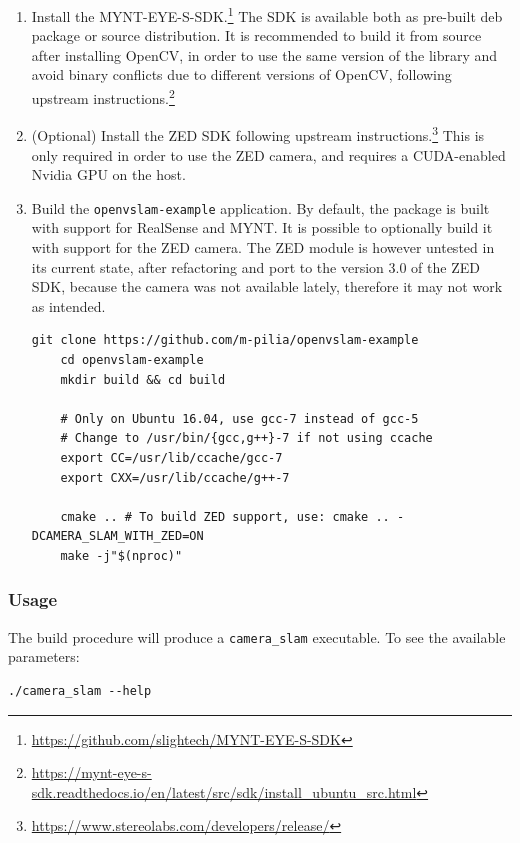\documentclass[11pt, letterpaper, twoside]{article}
\begin{document}
\begin{enumerate}
    \item Install the
        MYNT-EYE-S-SDK.\footnote{\url{https://github.com/slightech/MYNT-EYE-S-SDK}}
        The SDK is available both as pre-built deb package or source
        distribution. It is recommended to build it from source after
        installing OpenCV, in order to use the same version of the library and
        avoid binary conflicts due to different versions of OpenCV, following
        upstream
        instructions.\footnote{\url{https://mynt-eye-s-sdk.readthedocs.io/en/latest/src/sdk/install_ubuntu_src.html}}

    \item (Optional) Install the ZED SDK following upstream
        instructions.\footnote{\url{https://www.stereolabs.com/developers/release/}}
        This is only required in order to use the ZED camera, and requires a
        CUDA-enabled Nvidia GPU on the host.

    \item Build the \texttt{openvslam-example} application. By default, the
        package is built with support for RealSense and MYNT. It is possible to
        optionally build it with support for the ZED camera. The ZED module is
        however untested in its current state, after refactoring and port to
        the version 3.0 of the ZED SDK, because the camera was not available
        lately, therefore it may not work as intended.
\begin{Verbatim}[samepage=true]
    git clone https://github.com/m-pilia/openvslam-example
    cd openvslam-example
    mkdir build && cd build

    # Only on Ubuntu 16.04, use gcc-7 instead of gcc-5
    # Change to /usr/bin/{gcc,g++}-7 if not using ccache
    export CC=/usr/lib/ccache/gcc-7
    export CXX=/usr/lib/ccache/g++-7

    cmake .. # To build ZED support, use: cmake .. -DCAMERA_SLAM_WITH_ZED=ON
    make -j"$(nproc)"
\end{Verbatim}

\end{enumerate}

\subsubsection{Usage}

The build procedure will produce a \texttt{camera\_slam} executable. To see the
available parameters:
\begin{Verbatim}[samepage=true]
    ./camera_slam --help
\end{Verbatim}
\end{document}
